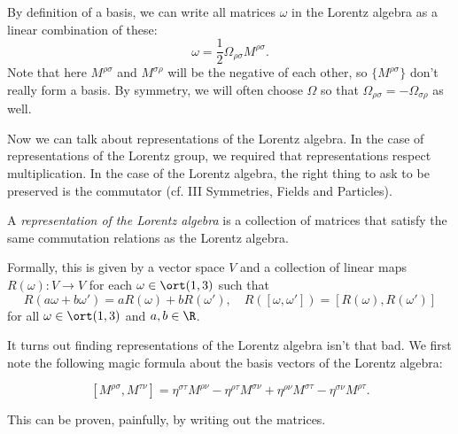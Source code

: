 \documentclass[a4paper]{article}
\begin{document}
By definition of a basis, we can write all matrices $\omega$ in the Lorentz algebra as a linear combination of these:
\[
  \omega = \frac{1}{2} \Omega_{\rho\sigma}M^{\rho\sigma}.
\]
Note that here $M^{\rho\sigma}$ and $M^{\sigma\rho}$ will be the negative of each other, so $\{M^{\rho\sigma}\}$ don't really form a basis. By symmetry, we will often choose $\Omega$ so that $\Omega_{\rho\sigma} = - \Omega_{\sigma \rho}$ as well.

Now we can talk about representations of the Lorentz algebra. In the case of representations of the Lorentz group, we required that representations respect multiplication. In the case of the Lorentz algebra, the right thing to ask to be preserved is the commutator (cf. III Symmetries, Fields and Particles).
\begin{defi}
  A \emph{representation of the Lorentz algebra} is a collection of matrices that satisfy the same commutation relations as the Lorentz algebra.

  Formally, this is given by a vector space $V$ and a collection of linear maps $R(\omega): V \to V$ for each $\omega \in \ort(1, 3)$ such that
  \[
    R(a \omega + b\omega') = aR(\omega) + bR(\omega'),\quad R([\omega, \omega']) = [R(\omega), R(\omega')]
  \]
  for all $\omega \in \ort(1, 3)$ and $a, b \in \R$.

\end{defi}
It turns out finding representations of the Lorentz algebra isn't that bad. We first note the following magic formula about the basis vectors of the Lorentz algebra:
\begin{prop}
  \[
    [M^{\rho\sigma}, M^{\tau\nu}] = \eta^{\sigma\tau} M^{\rho\nu} - \eta^{\rho\tau} M^{\sigma\nu} + \eta^{\rho\nu}M^{\sigma\tau} - \eta^{\sigma\nu}M^{\rho\tau}.
  \]
\end{prop}
This can be proven, painfully, by writing out the matrices.
\end{document}
